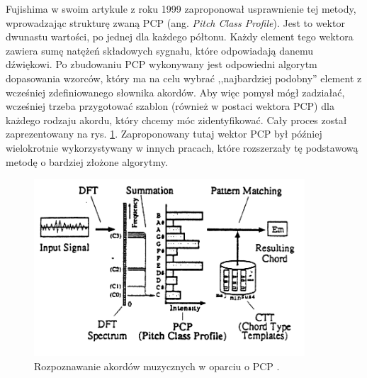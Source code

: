 Fujishima \cite{fujishima_realtime_1999} w swoim artykule z roku 1999 zaproponował usprawnienie tej metody, wprowadzając strukturę zwaną PCP (ang. \emph{Pitch Class Profile}). Jest to wektor dwunastu wartości, po jednej dla każdego półtonu. Każdy element tego wektora zawiera sumę natężeń składowych sygnału, które odpowiadają danemu dźwiękowi. Po zbudowaniu PCP wykonywany jest odpowiedni algorytm dopasowania wzorców, który ma na celu wybrać ,,najbardziej podobny'' element z wcześniej zdefiniowanego słownika akordów. Aby więc pomysł mógł zadziałać, wcześniej trzeba przygotować szablon (również w postaci wektora PCP) dla każdego rodzaju akordu, który chcemy móc zidentyfikować. Cały proces został zaprezentowany na rys. \ref{fig:rozpoznawanie_stare_2}. Zaproponowany tutaj wektor PCP był później wielokrotnie wykorzystywany w innych pracach, które rozszerzały tę podstawową metodę o bardziej złożone algorytmy.

\begin{figure}[htb]
    \centering
    \includegraphics[width=0.9\textwidth]{images/rozpoznawanie_stare_2}
    \caption{Rozpoznawanie akordów muzycznych w oparciu o PCP \cite{fujishima_realtime_1999}.}
    \label{fig:rozpoznawanie_stare_2}
\end{figure}
